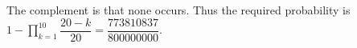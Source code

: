 The complement is that none occurs. Thus the required probability is $\boxed{1-\prod_{k=1}^{10}\dfrac{20-k}{20}=\dfrac{773810837}{800000000}}$.
